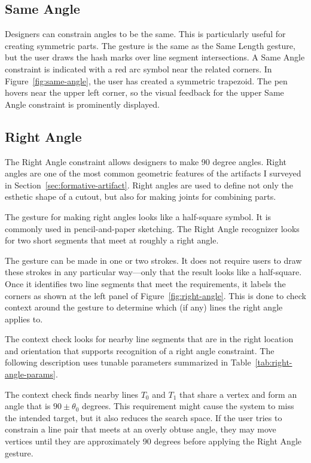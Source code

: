 \subsection{Same Angle}

Designers can constrain angles to be the same. This is particularly
useful for creating symmetric parts. The gesture is the same as the
Same Length gesture, but the user draws the hash marks over line
segment intersections. A Same Angle constraint is indicated with a red
arc symbol near the related corners. In Figure~\ref{fig:same-angle},
the user has created a symmetric trapezoid. The pen hovers near the
upper left corner, so the visual feedback for the upper Same Angle
constraint is prominently displayed.



\subsection{Right Angle}

The Right Angle constraint allows designers to make 90 degree
angles. Right angles are one of the most common geometric features of
the artifacts I surveyed in
Section~\ref{sec:formative-artifact}. Right angles are used to define
not only the esthetic shape of a cutout, but also for making joints
for combining parts.

The gesture for making right angles looks like a half-square
symbol. It is commonly used in pencil-and-paper sketching. The Right
Angle recognizer looks for two short segments that meet at roughly a
right angle. 

The gesture can be made in one or two strokes. It does not require
users to draw these strokes in any particular way---only that the
result looks like a half-square. Once it identifies two line segments
that meet the requirements, it labels the corners as shown at the left
panel of Figure~\ref{fig:right-angle}. This is done to check context
around the gesture to determine which (if any) lines the right angle
applies to.

The context check looks for nearby line segments that are in the right
location and orientation that supports recognition of a right angle
constraint.  The following description uses tunable parameters
summarized in Table~\ref{tab:right-angle-params}. 

The context check finds nearby lines $T_0$ and $T_1$ that share a
vertex and form an angle that is $90\pm\theta_0$ degrees. This
requirement might cause the system to miss the intended target, but it
also reduces the search space. If the user tries to constrain a line
pair that meets at an overly obtuse angle, they may move vertices
until they are approximately 90 degrees before applying the Right
Angle gesture.

